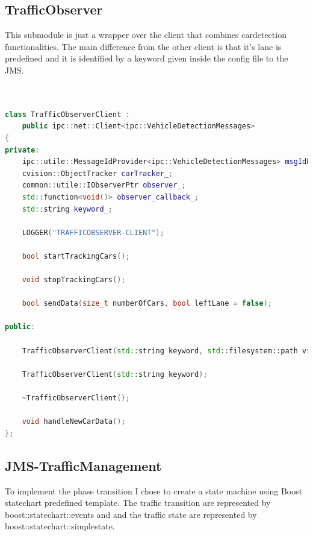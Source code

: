 \documentclass[17pt]{article}
\begin{document}
\subsection{TrafficObserver}
\indent \indent
This submodule is just a wrapper over the client that combines cardetection 
functionalities. The main difference from the other client is that it's lane 
is predefined and it is identified by a keyword given inside the config file 
to the JMS.

\begin{lstlisting}[language = C++]


class TrafficObserverClient : 
    public ipc::net::Client<ipc::VehicleDetectionMessages>
{
private:
    ipc::utile::MessageIdProvider<ipc::VehicleDetectionMessages> msgIdProvider_;
    cvision::ObjectTracker carTracker_;
    common::utile::IObserverPtr observer_;
    std::function<void()> observer_callback_;
    std::string keyword_;

    LOGGER("TRAFFICOBSERVER-CLIENT");

    bool startTrackingCars();

    void stopTrackingCars();

    bool sendData(size_t numberOfCars, bool leftLane = false);

public:

    TrafficObserverClient(std::string keyword, std::filesystem::path videoPath);

    TrafficObserverClient(std::string keyword);

    ~TrafficObserverClient();

    void handleNewCarData();
};
\end{lstlisting}

\pagebreak
\subsection{JMS-TrafficManagement}

\indent \indent
To implement the phase transition I chose to create a state machine
using Boost statechart predefined template. The traffic transition are represented 
by boost::statechart::events and and the traffic state are represented by 
boost::statechart::simplestate.
\end{document}
